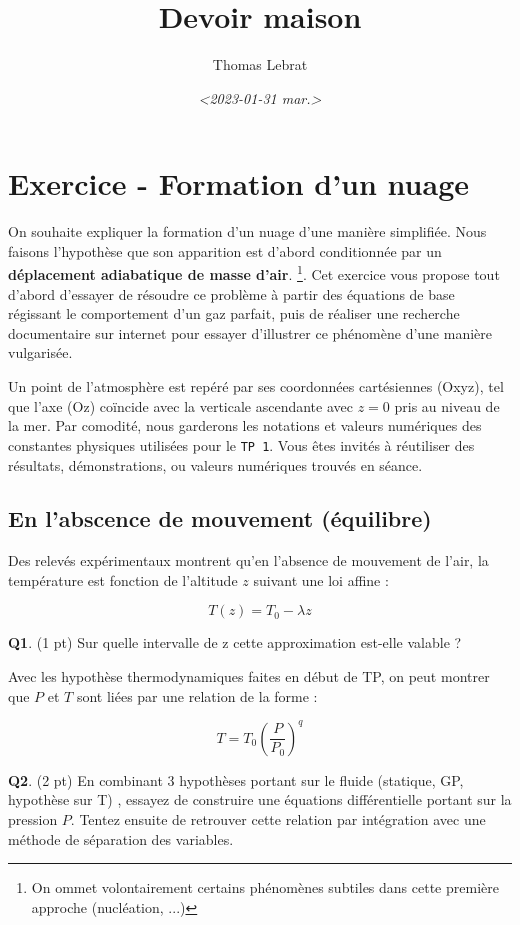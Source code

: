 \documentclass[letterpaper, 11pt]{article}
\author{Thomas Lebrat}
\date{\textit{<2023-01-31 mar.>}}
\title{Devoir maison}
\begin{document}
\tableofcontents



\section{Exercice - Formation d'un nuage}
\label{sec:org0a706fb}

On souhaite expliquer la formation d'un nuage d'une manière simplifiée. Nous faisons l'hypothèse que son apparition est d'abord conditionnée par un \textbf{\textbf{déplacement adiabatique de masse d’air}}. \footnote{On ommet volontairement certains phénomènes subtiles dans cette première approche (nucléation, ...)}. Cet exercice vous propose tout d'abord d'essayer de résoudre ce problème à partir des équations de base régissant le comportement d'un gaz parfait, puis de réaliser une recherche documentaire sur internet pour essayer d'illustrer ce phénomène d'une manière vulgarisée.

Un point de l'atmosphère est repéré par ses coordonnées cartésiennes (Oxyz), tel que l'axe (Oz) coïncide avec la verticale ascendante avec \(z=0\) pris au niveau de la mer. Par comodité, nous garderons les notations et valeurs numériques des constantes physiques utilisées pour le \texttt{TP 1}. Vous êtes invités à réutiliser des résultats, démonstrations, ou valeurs numériques trouvés en séance.

\subsection{En l'abscence de mouvement (équilibre)}
\label{sec:orgb66527b}

Des relevés expérimentaux montrent qu'en l'absence de mouvement de l'air, la température est fonction de l'altitude \(z\) suivant une loi affine : 

$$ T(z) = T_{0} - \lambda z $$

\textbf{Q1}. (1 pt) Sur quelle intervalle de z cette approximation est-elle valable ?

\newpage

Avec les hypothèse thermodynamiques faites en début de TP, on peut montrer que \(P\) et \(T\) sont liées par une relation de la forme : 

$$ T =T_0 \left( \frac{P}{P_0}  \right)^{q} $$

\textbf{Q2}. (2 pt) En combinant 3 hypothèses portant sur le fluide (statique, GP, hypothèse sur T) , essayez de construire une équations différentielle portant sur la pression \(P\). Tentez ensuite de retrouver cette relation par intégration avec une méthode de séparation des variables.
\end{document}
